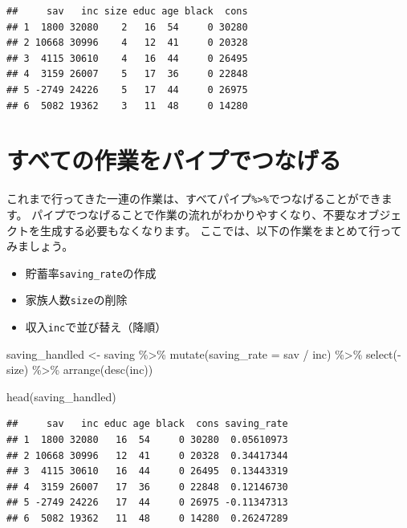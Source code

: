 \documentclass[
]{book}
\newenvironment{Shaded}{\begin{snugshade}}{\end{snugshade}}
\newcommand{\AttributeTok}[1]{\textcolor[rgb]{0.77,0.63,0.00}{#1}}
\newcommand{\FunctionTok}[1]{\textcolor[rgb]{0.00,0.00,0.00}{#1}}
\newcommand{\NormalTok}[1]{#1}
\newcommand{\OtherTok}[1]{\textcolor[rgb]{0.56,0.35,0.01}{#1}}
\newcommand{\SpecialCharTok}[1]{\textcolor[rgb]{0.00,0.00,0.00}{#1}}
\providecommand{\tightlist}{%
  \setlength{\itemsep}{0pt}\setlength{\parskip}{0pt}}
\begin{document}
\begin{verbatim}
##     sav   inc size educ age black  cons
## 1  1800 32080    2   16  54     0 30280
## 2 10668 30996    4   12  41     0 20328
## 3  4115 30610    4   16  44     0 26495
## 4  3159 26007    5   17  36     0 22848
## 5 -2749 24226    5   17  44     0 26975
## 6  5082 19362    3   11  48     0 14280
\end{verbatim}

\hypertarget{ux3059ux3079ux3066ux306eux4f5cux696dux3092ux30d1ux30a4ux30d7ux3067ux3064ux306aux3052ux308b}{%
\section{すべての作業をパイプでつなげる}\label{ux3059ux3079ux3066ux306eux4f5cux696dux3092ux30d1ux30a4ux30d7ux3067ux3064ux306aux3052ux308b}}

これまで行ってきた一連の作業は、すべてパイプ\texttt{\%\textgreater{}\%}でつなげることができます。
パイプでつなげることで作業の流れがわかりやすくなり、不要なオブジェクトを生成する必要もなくなります。
ここでは、以下の作業をまとめて行ってみましょう。

\begin{itemize}
\tightlist
\item
  貯蓄率\texttt{saving\_rate}の作成
\item
  家族人数\texttt{size}の削除
\item
  収入\texttt{inc}で並び替え（降順）
\end{itemize}

\begin{Shaded}
\begin{Highlighting}[]
\NormalTok{saving\_handled }\OtherTok{\textless{}{-}}
\NormalTok{  saving }\SpecialCharTok{\%\textgreater{}\%}
    \FunctionTok{mutate}\NormalTok{(}\AttributeTok{saving\_rate =}\NormalTok{ sav }\SpecialCharTok{/}\NormalTok{ inc) }\SpecialCharTok{\%\textgreater{}\%}
    \FunctionTok{select}\NormalTok{(}\SpecialCharTok{{-}}\NormalTok{size) }\SpecialCharTok{\%\textgreater{}\%}
    \FunctionTok{arrange}\NormalTok{(}\FunctionTok{desc}\NormalTok{(inc))}

\FunctionTok{head}\NormalTok{(saving\_handled)}
\end{Highlighting}
\end{Shaded}

\begin{verbatim}
##     sav   inc educ age black  cons saving_rate
## 1  1800 32080   16  54     0 30280  0.05610973
## 2 10668 30996   12  41     0 20328  0.34417344
## 3  4115 30610   16  44     0 26495  0.13443319
## 4  3159 26007   17  36     0 22848  0.12146730
## 5 -2749 24226   17  44     0 26975 -0.11347313
## 6  5082 19362   11  48     0 14280  0.26247289
\end{verbatim}
\end{document}
